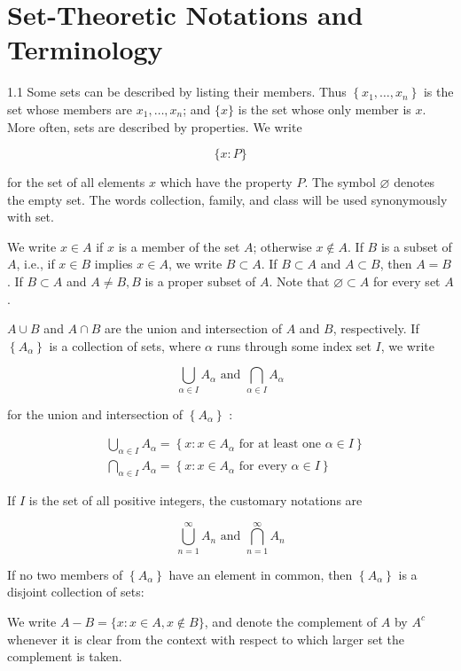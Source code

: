 \documentclass[10pt]{article}
\begin{document}
\section{Set-Theoretic Notations and Terminology}
1.1 Some sets can be described by listing their members. Thus $\left\{x_{1}, \ldots, x_{n}\right\}$ is the set whose members are $x_{1}, \ldots, x_{n}$; and $\{x\}$ is the set whose only member is $x$. More often, sets are described by properties. We write

$$
\{x: P\}
$$

for the set of all elements $x$ which have the property $P$. The symbol $\varnothing$ denotes the empty set. The words collection, family, and class will be used synonymously with set.

We write $x \in A$ if $x$ is a member of the set $A$; otherwise $x \notin A$. If $B$ is a subset of $A$, i.e., if $x \in B$ implies $x \in A$, we write $B \subset A$. If $B \subset A$ and $A \subset B$, then $A=B$. If $B \subset A$ and $A \neq B, B$ is a proper subset of $A$. Note that $\varnothing \subset A$ for every set $A$.

$A \cup B$ and $A \cap B$ are the union and intersection of $A$ and $B$, respectively. If $\left\{A_{\alpha}\right\}$ is a collection of sets, where $\alpha$ runs through some index set $I$, we write

$$
\bigcup_{\alpha \in I} A_{\alpha} \text { and } \bigcap_{\alpha \in I} A_{\alpha}
$$

for the union and intersection of $\left\{A_{\alpha}\right\}$ :

$$
\begin{aligned}
& \bigcup_{\alpha \in I} A_{\alpha}=\left\{x: x \in A_{\alpha} \text { for at least one } \alpha \in I\right\} \\
& \bigcap_{\alpha \in I} A_{\alpha}=\left\{x: x \in A_{\alpha} \text { for every } \alpha \in I\right\}
\end{aligned}
$$

If $I$ is the set of all positive integers, the customary notations are

$$
\bigcup_{n=1}^{\infty} A_{n} \text { and } \bigcap_{n=1}^{\infty} A_{n}
$$

If no two members of $\left\{A_{\alpha}\right\}$ have an element in common, then $\left\{A_{\alpha}\right\}$ is a disjoint collection of sets:

We write $A-B=\{x: x \in A, x \notin B\}$, and denote the complement of $A$ by $A^{c}$ whenever it is clear from the context with respect to which larger set the complement is taken.
\end{document}
